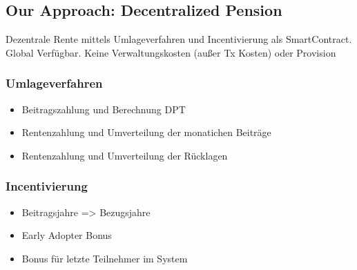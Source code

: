 \subsection{Our Approach: Decentralized Pension}

Dezentrale Rente mittels Umlageverfahren und Incentivierung als SmartContract.
Global Verfügbar. Keine Verwaltungskosten (außer Tx Kosten) oder Provision

\subsubsection{Umlageverfahren}

\begin{itemize}
\item Beitragszahlung und Berechnung DPT
\item Rentenzahlung und Umverteilung der monatichen Beiträge
\item Rentenzahlung und Umverteilung der Rücklagen
\end{itemize}

\subsubsection{Incentivierung}

\begin{itemize}
\item Beitragsjahre => Bezugsjahre
\item Early Adopter Bonus
\item Bonus für letzte Teilnehmer im System
\end{itemize}